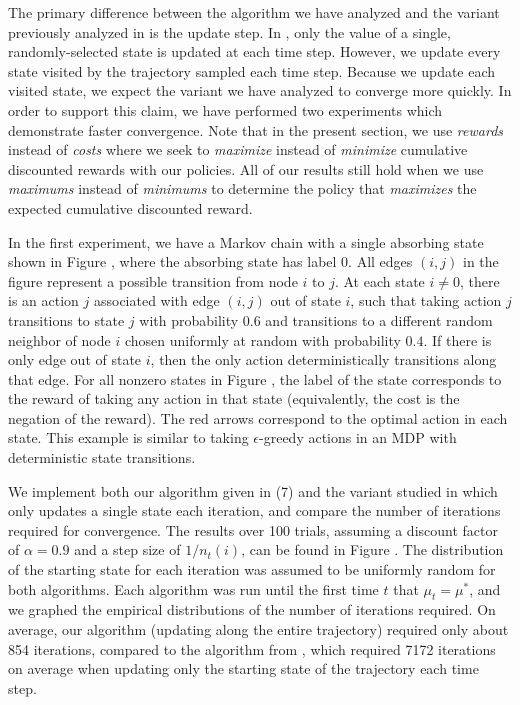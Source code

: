 \documentclass[12pt]{article}
\begin{document}
The primary difference between the algorithm we have analyzed and the variant previously analyzed in \cite{tsitsiklis2002convergence} is the update step. In \cite{tsitsiklis2002convergence}, only the value of a single, randomly-selected state is updated at each time step. However, we update every state visited by the trajectory sampled each time step. Because we update each visited state, we expect the variant we have analyzed to converge more quickly. In order to support this claim, we have performed two experiments which demonstrate faster convergence. Note that in the present section, we use \textit{rewards} instead of \textit{costs} where we seek to \textit{maximize} instead of \textit{minimize} cumulative discounted rewards with our policies. All of our results still hold when we use \textit{maximums} instead of \textit{minimums} to determine the policy that \textit{maximizes} the expected cumulative discounted reward.

In the first experiment, we have a Markov chain with a single absorbing state shown in Figure , where the absorbing state has label 0. All edges $(i,j)$ in the figure represent a possible transition from node $i$ to $j$. At each state $i \neq 0$, there is an action $j$ associated with edge $(i,j)$ out of state $i$, such that taking action $j$ transitions to state $j$ with probability $0.6$ and transitions to a different random neighbor of node $i$ chosen uniformly at random with probability $0.4$. If there is only edge out of state $i$, then the only action deterministically transitions along that edge. For all nonzero states in Figure , the label of the state corresponds to the reward of taking any action in that state (equivalently, the cost is the negation of the reward). The red arrows correspond to the optimal action in each state. This example is similar to taking $\epsilon$-greedy actions in an MDP with deterministic state transitions.

We implement both our algorithm given in (7) and the variant studied in \cite{tsitsiklis2002convergence} which only updates a single state each iteration, and compare the number of iterations required for convergence. The results over 100 trials, assuming a discount factor of $\alpha = 0.9$ and a step size of $1/n_t(i)$, can be found in Figure . The distribution of the starting state for each iteration was assumed to be uniformly random for both algorithms. Each algorithm was run until the first time $t$ that $\mu_t = \mu^*$, and we graphed the empirical distributions of the number of iterations required. On average, our algorithm (updating along the entire trajectory) required only about 854 iterations, compared to the algorithm from \cite{tsitsiklis2002convergence}, which required 7172 iterations on average when updating only the starting state of the trajectory each time step.
\end{document}
